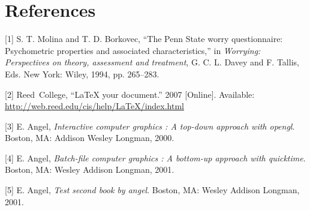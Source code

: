 \documentclass[twoside,12pt,final]{ucthesis-CA2012}
\begin{document}
\begin{ucmainmatter}
\hypertarget{references}{%
\chapter*{References}\label{references}}


\noindent

\setlength{\parindent}{-0.20in}
\setlength{\leftskip}{0.20in}
\setlength{\parskip}{8pt}

\hypertarget{refs}{}
\leavevmode\hypertarget{ref-Molina1994}{}%
{[}1{]} S. T. Molina and T. D. Borkovec, ``The Penn State worry questionnaire: Psychometric properties and associated characteristics,'' in \emph{Worrying: Perspectives on theory, assessment and treatment}, G. C. L. Davey and F. Tallis, Eds. New York: Wiley, 1994, pp. 265--283.

\leavevmode\hypertarget{ref-reedweb2007}{}%
{[}2{]} Reed~College, ``LaTeX your document.'' 2007 {[}Online{]}. Available: \url{http://web.reed.edu/cis/help/LaTeX/index.html}

\leavevmode\hypertarget{ref-angel2000}{}%
{[}3{]} E. Angel, \emph{Interactive computer graphics : A top-down approach with opengl}. Boston, MA: Addison Wesley Longman, 2000.

\leavevmode\hypertarget{ref-angel2001}{}%
{[}4{]} E. Angel, \emph{Batch-file computer graphics : A bottom-up approach with quicktime}. Boston, MA: Wesley Addison Longman, 2001.

\leavevmode\hypertarget{ref-angel2002a}{}%
{[}5{]} E. Angel, \emph{Test second book by angel}. Boston, MA: Wesley Addison Longman, 2001.

\end{ucmainmatter}
\end{document}
